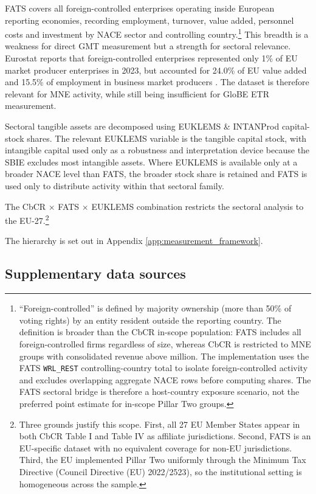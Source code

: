 \documentclass[11pt,a4paper]{article}
\newcommand{\EUR}{\texteuro}
\newcommand{\code}[1]{\texttt{#1}}
\begin{document}
FATS covers all foreign-controlled enterprises operating inside European reporting economies, recording employment, turnover, value added, personnel costs and investment by NACE sector and controlling country.\footnote{``Foreign-controlled'' is defined by majority ownership (more than 50\% of voting rights) by an entity resident outside the reporting country. The definition is broader than the CbCR in-scope population: FATS includes all foreign-controlled firms regardless of size, whereas CbCR is restricted to MNE groups with consolidated revenue above \EUR750 million. The implementation uses the FATS \code{WRL\_REST} controlling-country total to isolate foreign-controlled activity and excludes overlapping aggregate NACE rows before computing shares. The FATS sectoral bridge is therefore a host-country exposure scenario, not the preferred point estimate for in-scope Pillar Two groups.} This breadth is a weakness for direct GMT measurement but a strength for sectoral relevance. Eurostat reports that foreign-controlled enterprises represented only 1\% of EU market producer enterprises in 2023, but accounted for 24.0\% of EU value added and 15.5\% of employment in business market producers \citep{eurostat2025fats}. The dataset is therefore relevant for MNE activity, while still being insufficient for GloBE ETR measurement.

Sectoral tangible assets are decomposed using EUKLEMS \& INTANProd capital-stock shares. The relevant EUKLEMS variable is the tangible capital stock, with intangible capital used only as a robustness and interpretation device because the SBIE excludes most intangible assets. Where EUKLEMS is available only at a broader NACE level than FATS, the broader stock share is retained and FATS is used only to distribute activity within that sectoral family. 

The CbCR $\times$ FATS $\times$ EUKLEMS combination restricts the sectoral analysis to the EU-27.\footnote{Three grounds justify this scope. First, all 27 EU Member States appear in both CbCR Table I and Table IV as affiliate jurisdictions. Second, FATS is an EU-specific dataset with no equivalent coverage for non-EU jurisdictions. Third, the EU implemented Pillar Two uniformly through the Minimum Tax Directive (Council Directive (EU) 2022/2523), so the institutional setting is homogeneous across the sample.}

The hierarchy is set out in Appendix \ref{app:measurement_framework}.

\subsection{Supplementary data sources}\label{sec:supplementary}
\end{document}
